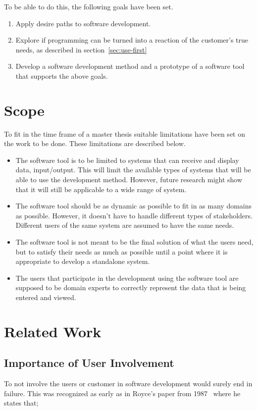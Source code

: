 \documentclass[a4paper]{report}
\begin{document}
To be able to do this, the following goals have been set. 

\begin{enumerate}
	\item Apply desire paths to software development.
	\item Explore if programming can be turned into a reaction of the customer's true needs, as described in section~\ref{sec:use-first}
	\item Develop a software development method and a prototype of a software tool that supports the above goals.
\end{enumerate}

\section{Scope}
To fit in the time frame of a master thesis suitable limitations have been set on the work to be done. These limitations are described below.

\begin{itemize}
	\item The software tool is to be limited to systems that can receive and display data, input/output. This will limit the available types of systems that will be able to use the development method. However, future research might show that it will still be applicable to a wide range of system.
	\item The software tool should be as dynamic as possible to fit in as many domains as possible. However, it doesn't have to handle different types of stakeholders. Different users of the same system are assumed to have the same needs.
	\item The software tool is not meant to be the final solution of what the users need, but to satisfy their needs as much as possible until a point where it is appropriate to develop a standalone system.
	\item The users that participate in the development using the software tool are supposed to be domain experts to correctly represent the data that is being entered and viewed.
\end{itemize}

\section{Related Work}

\subsection{Importance of User Involvement} \label{sec:importance-of-user-involvement}
To not involve the users or customer in software development would surely end in failure. This was recognized as early as in Royce's paper from 1987~\cite{Royce:1987} where he states that; 
\end{document}
